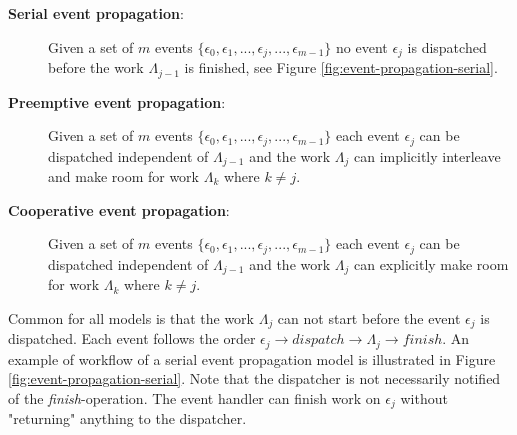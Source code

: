 \begin{description}

    \item[\textbf{Serial event propagation}:] Given a set of $m$ events $\{
            \epsilon_0, \epsilon_1, ..., \epsilon_j, ..., \epsilon_{m-1} \}$ no
        event $\epsilon_j$ is dispatched before the work $\Lambda_{j-1}$ is
        finished, see Figure \ref{fig:event-propagation-serial}.

    \item[\textbf{Preemptive event propagation}:] Given a set of $m$ events $\{
            \epsilon_0, \epsilon_1, ..., \epsilon_j, ..., \epsilon_{m-1} \}$
        each event $\epsilon_j$ can be dispatched independent of
        $\Lambda_{j-1}$ and the work $\Lambda_j$ can implicitly interleave and
        make room for work $\Lambda_k$ where $k \ne j$.

    \item[\textbf{Cooperative event propagation}:] Given a set of $m$ events
        $\{ \epsilon_0, \epsilon_1, ..., \epsilon_j, ..., \epsilon_{m-1} \}$
        each event $\epsilon_j$ can be dispatched independent of
        $\Lambda_{j-1}$ and the work $\Lambda_j$ can explicitly make room for
        work $\Lambda_k$ where $k \ne j$.

\end{description}

Common for all models is that the work $\Lambda_j$ can not start before the
event $\epsilon_j$ is dispatched. Each event follows the order $\epsilon_j
\rightarrow dispatch \rightarrow \Lambda_j \rightarrow finish$. An example of
workflow of a serial event propagation model is illustrated in Figure
\ref{fig:event-propagation-serial}. Note that the dispatcher is not necessarily
notified of the \textit{finish}-operation. The event handler can finish work on
$\epsilon_j$ without "returning" anything to the dispatcher.

